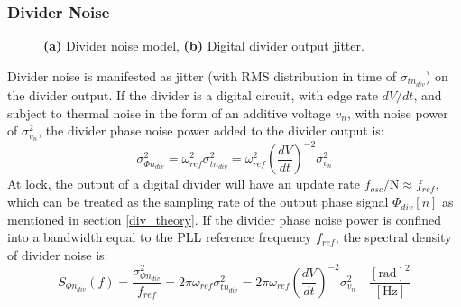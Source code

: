\subsubsection{Divider Noise}
	\begin{figure}[htb!]
	    \centering
	    \begin{subfigure}{0.5\textwidth}
	        \centering
	        
	        \caption{ }
	        \label{fig:div_pn_model}
	    \end{subfigure}%
	    \begin{subfigure}{0.5\textwidth}
	        \centering
	        
	        \caption{ }
	        \label{fig:div_jitter}
	    \end{subfigure}
	    \label{fig:div_pn}
	    \caption{\textbf{(a)} Divider noise model, \textbf{(b)} Digital divider output jitter.}
	\end{figure}
	\FloatBarrier
	Divider noise is manifested as jitter (with RMS distribution in time of $\sigma_{t n_{div}}$) on the divider output. If the divider is a digital circuit, with edge rate $dV/dt$, and subject to thermal noise in the form of an additive voltage $v_n$, with noise power of $\sigma_{v_n}^2$, the divider phase noise power added to the divider output is:
	\begin{equation}
		\sigma_{\Phi n_{div}}^2 = \omega^2_{ref}\sigma^2_{t n_{div}}  =\omega^2_{ref}\left(\frac{dV}{dt}\right)^{-2}\sigma_{v_n}^2
	\end{equation}
	At lock, the output of a digital divider will have an update rate $f_{{osc}}/\mathrm{N} \approx f_{ref}$, which can be treated as the sampling rate of the output phase signal $\Phi_{div}[n]$ as mentioned in section \ref{div_theory}. If the divider phase noise power is confined into a bandwidth equal to the PLL reference frequency $f_{ref}$, the spectral density of divider noise is:
	\begin{equation}
		S_{\Phi n_{div}}(f) = \frac{\sigma_{\Phi n_{div}}^2}{f_{ref}} = 2\pi\omega_{ref}\sigma^2_{t n_{div}}  =2\pi\omega_{ref}\left(\frac{dV}{dt}\right)^{-2}\sigma_{v_n}^2\hspace{1em}\frac{[\text{rad}]^2}{[\text{Hz}]}
	\end{equation}

